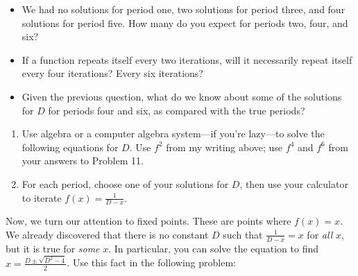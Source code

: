 \documentclass[../textbook.tex]{subfiles}
\begin{document}
\begin{itemize}
\item We had no solutions for period one, two solutions for period three, and four solutions for period five. How many do you expect for periods two, four, and six?
\item If a function repeats itself every two iterations, will it necessarily repeat itself every four iterations? Every six iterations?
\item Given the previous question, what do we know about some of the solutions for $D$ for periods four and six, as compared with the true periods?
\end{itemize}
\begin{enumerate}
\setcounter{enumi}{\value{problem_i}}
\item Use algebra or a computer algebra system---if you're lazy---to solve the following equations for $D$. Use $f^2$ from my writing above; use $f^4$ and $f^6$ from your answers to Problem 11.
\begin{enumerate}
\end{enumerate}
\item For each period, choose one of your solutions for $D$, then use your calculator to iterate $f(x)=\frac{1}{D-x}$.
\begin{enumerate}
\end{enumerate}
\setcounter{problem_i}{\value{enumi}}
\end{enumerate}

\noindent Now, we turn our attention to fixed points. These are points where $f(x)=x$. We already discovered that there is no constant $D$ such that $\frac{1}{D-x}=x$ for \textit{all} $x$, but it is true for \textit{some} $x$. In particular, you can solve the equation to find $x=\frac{D\pm \sqrt{D^2-4}}{2}$. Use this fact in the following problem:
\end{document}
